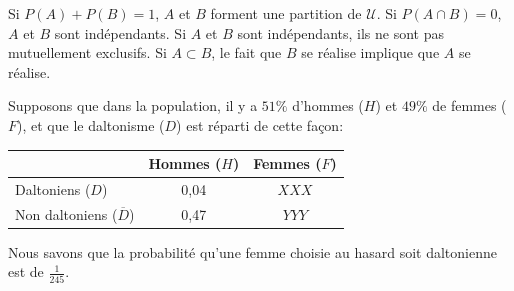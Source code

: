 \begin{questions}
\vspace{0.25cm}
\begin{checkboxes}
    \choice Si $P(A)+P(B)=1$, $A$ et $B$ forment une partition de $\mathcal{U}$.
    \choice Si $P(A\cap B)=0$, $A$ et $B$ sont indépendants.
    \correctchoice Si $A$ et $B$ sont indépendants, ils ne sont pas mutuellement exclusifs.
    \choice Si $A\subset B$, le fait que $B$ se réalise implique que $A$ se réalise.
\end{checkboxes}
    \pageblanche
    
\question 

Supposons que dans la population, il y a $51\%$ d'hommes ($H$) et $49\%$ de femmes ($F$), et que le daltonisme ($D$) est réparti de cette façon:

\begin{table}[h]
    \centering
    \begin{tabular}{l|c|c}
    \hline \hline
        & Hommes ($H$) & Femmes ($F$) \\
    \hline
        Daltoniens ($D$) & 0,04 & $XXX$ \\ 
        Non daltoniens ($\overline{D}$) &0,47 & $YYY$ \\
        \hline

        \hline
    \end{tabular}
\end{table}

Nous savons que la probabilité qu'une femme choisie au hasard soit daltonienne est de $\frac{1}{245}$.

\end{questions}
